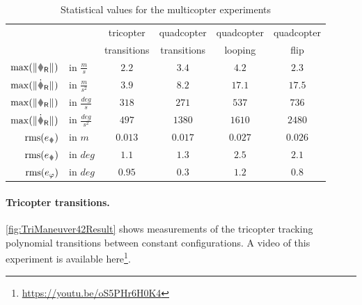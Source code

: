 \begin{table}[htb]
 \centering
 \setlength{\tabcolsep}{.1em}
 \begin{tabular}{rlcccc}
  \toprule
   && \quad tricopter\quad & \quad quadcopter\quad & \quad quadcopter\quad & \quad quadcopter\quad \\
   && \quad transitions \quad & \quad transitions \quad & \quad looping \quad & \quad flip \quad \\
  \midrule
  $\max(\norm{\vR})$  &in $\tfrac{\unit{m}}{\unit{s}}$     & $2.2$   & $3.4$   & $4.2$   & $2.3$ \\[.5ex]
  $\max(\norm{\vRd})$ &in $\tfrac{\unit{m}}{\unit{s}^2}$   & $3.9$   & $8.2$   & $17.1$   & $17.5$ \\[.5ex]
  $\max(\norm{\wR})$  &in $\tfrac{\unit{deg}}{\unit{s}}$   & $318$   & $271$   & $537$   & $736$ \\[.5ex]
  $\max(\norm{\wRd})$ &in $\tfrac{\unit{deg}}{\unit{s}^2}$ & $497$   & $1380$  & $1610$  & $2480$ 
  \\[1ex]
  $\RMS(e_{\r})$      &in $\unit{m}$                       & $0.013$ & $0.017$ & $0.027$ & $0.026$ \\[.5ex]
  $\RMS(e_{\R})$      &in $\unit{deg}$                     & $1.1$   & $1.3$   & $2.5$   & $2.1$   \\[.5ex]
  $\operatorname{rms}(e_{\varphi})$   &in $\unit{deg}$                     & $0.95$  & $0.3$   & $1.2$   & $0.8$   \\
  \bottomrule
 \end{tabular}
 \caption{Statistical values for the multicopter experiments}
 \label{tab:MulticopterExperimentStatistics}
\end{table}


\paragraph{Tricopter transitions.}
\autoref{fig:TriManeuver42Result} shows measurements of the tricopter tracking polynomial transitions between constant configurations.
A video of this experiment is available here\footnote{\url{https://youtu.be/oS5PHr6H0K4}}.

